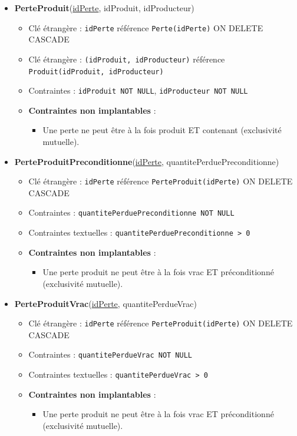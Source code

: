 \begin{itemize}
    \item \textbf{PerteProduit}(\underline{idPerte}, idProduit, idProducteur)
    \begin{itemize}
        \item Clé étrangère : \texttt{idPerte} référence \texttt{Perte(idPerte)} ON DELETE CASCADE
        \item Clé étrangère : \texttt{(idProduit, idProducteur)} référence \texttt{Produit(idProduit, idProducteur)}
        \item Contraintes : \texttt{idProduit NOT NULL}, \texttt{idProducteur NOT NULL}
        \item \textbf{Contraintes non implantables} :
        \begin{itemize}
            \item Une perte ne peut être à la fois produit ET contenant (exclusivité mutuelle).
        \end{itemize}
    \end{itemize}
    
    \item \textbf{PerteProduitPreconditionne}(\underline{idPerte}, quantitePerduePreconditionne)
    \begin{itemize}
        \item Clé étrangère : \texttt{idPerte} référence \texttt{PerteProduit(idPerte)} ON DELETE CASCADE
        \item Contraintes : \texttt{quantitePerduePreconditionne NOT NULL}
        \item Contraintes textuelles : \texttt{quantitePerduePreconditionne > 0}
        \item \textbf{Contraintes non implantables} :
        \begin{itemize}
            \item Une perte produit ne peut être à la fois vrac ET préconditionné (exclusivité mutuelle).
        \end{itemize}
    \end{itemize}
    
    \item \textbf{PerteProduitVrac}(\underline{idPerte}, quantitePerdueVrac)
    \begin{itemize}
        \item Clé étrangère : \texttt{idPerte} référence \texttt{PerteProduit(idPerte)} ON DELETE CASCADE
        \item Contraintes : \texttt{quantitePerdueVrac NOT NULL}
        \item Contraintes textuelles : \texttt{quantitePerdueVrac > 0}
        \item \textbf{Contraintes non implantables} :
        \begin{itemize}
            \item Une perte produit ne peut être à la fois vrac ET préconditionné (exclusivité mutuelle).
        \end{itemize}
    \end{itemize}
    

\end{itemize}
